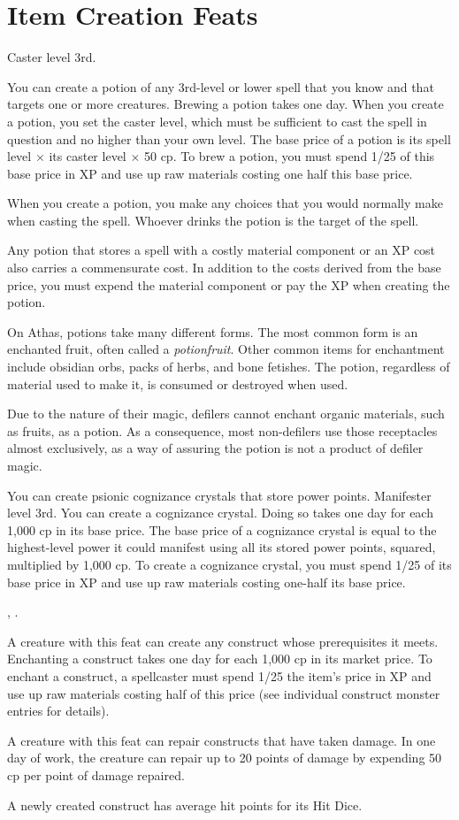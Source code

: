 \section{Item Creation Feats}

{}
{Caster level 3rd.}
{You can create a potion of any 3rd-level or lower spell that you know and that targets one or more creatures. Brewing a potion takes one day. When you create a potion, you set the caster level, which must be sufficient to cast the spell in question and no higher than your own level. The base price of a potion is its spell level $\times$ its caster level $\times$ 50 cp. To brew a potion, you must spend 1/25 of this base price in XP and use up raw materials costing one half this base price.

When you create a potion, you make any choices that you would normally make when casting the spell. Whoever drinks the potion is the target of the spell.

Any potion that stores a spell with a costly material component or an XP cost also carries a commensurate cost. In addition to the costs derived from the base price, you must expend the material component or pay the XP when creating the potion.}
{}
{On Athas, potions take many different forms. The most common form is an enchanted fruit, often called a \emph{potionfruit}. Other common items for enchantment include obsidian orbs, packs of herbs, and bone fetishes. The potion, regardless of material used to make it, is consumed or destroyed when used.

Due to the nature of their magic, defilers cannot enchant organic materials, such as fruits, as a potion. As a consequence, most non-defilers use those receptacles almost exclusively, as a way of assuring the potion is not a product of defiler magic.}

{You can create psionic cognizance crystals that store power points.}
{Manifester level 3rd.}
{You can create a cognizance crystal. Doing so takes one day for each 1,000 cp in its base price. The base price of a cognizance crystal is equal to the highest-level power it could manifest using all its stored power points, squared, multiplied by 1,000 cp. To create a cognizance crystal, you must spend 1/25 of its base price in XP and use up raw materials costing one-half its base price.}{}{}

{, .}
{A creature with this feat can create any construct whose prerequisites it meets. Enchanting a construct takes one day for each 1,000 cp in its market price. To enchant a construct, a spellcaster must spend 1/25 the item's price in XP and use up raw materials costing half of this price (see individual construct monster entries for details).

A creature with this feat can repair constructs that have taken damage. In one day of work, the creature can repair up to 20 points of damage by expending 50 cp per point of damage repaired.

A newly created construct has average hit points for its Hit Dice.}

